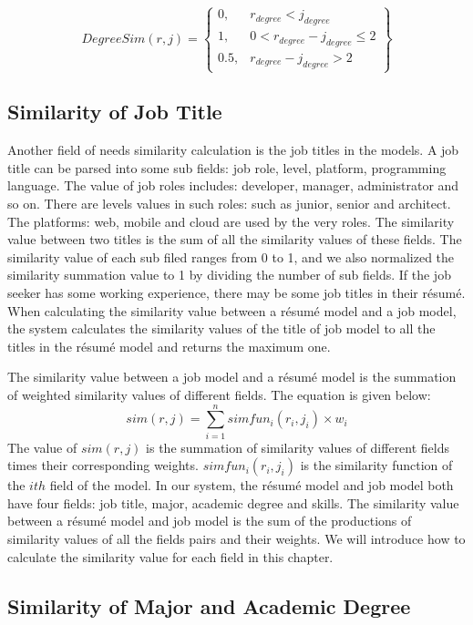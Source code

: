 $$ DegreeSim(r,j ) = \begin{Bmatrix}
0,   & r_{degree} < j_{degree} \\
1,   & 0 < r_{degree} - j_{degree} \leqslant 2  \\
0.5, & r_{degree} - j_{degree} > 2
\end{Bmatrix} $$

\subsection{Similarity of Job Title}
Another field of needs similarity calculation is the job titles in the models. A job title can be parsed into some sub fields: job role, level, platform, programming language.  The value of job roles includes: developer, manager, administrator and so on. There are levels values in such roles: such as junior, senior and architect. The platforms: web, mobile and cloud are used by the very roles.  The similarity value between two titles is the sum of all the similarity values of these fields. The similarity value of each sub filed ranges from 0 to 1, and we also normalized the similarity summation value to 1 by dividing the number of sub fields. If the job seeker has some working experience, there may be some job titles in their r\'esum\'e.  When calculating the similarity value between a r\'esum\'e model and a job model, the system calculates the similarity values of the title of job model to all the titles in the r\'esum\'e model and returns the maximum one.

 The similarity value between a  job model and a r\'esum\'e model is the summation of weighted similarity values of different fields. The equation is given below:
$$ sim(r, j) = \sum_{i=1}^{n} simfun_i(r_i,j_i) \times w_i $$
The value of $sim(r, j)$ is the summation of similarity values of different fields times their corresponding weights. $simfun_i(r_i,j_i)$ is the similarity function of the $ith$ field of the model. In our system, the r\'esum\'e model and job model both have four fields: job title, major, academic degree and skills. The similarity value between a r\'esum\'e model and job model is the sum of the productions of similarity values of all the fields pairs and their weights. We will introduce how to calculate the similarity value for each field in this chapter.

\subsection{Similarity of Major and Academic Degree}

